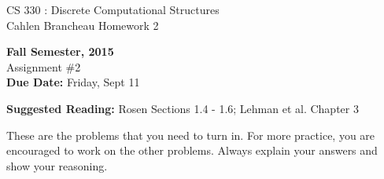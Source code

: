 \setlength{\oddsidemargin}{12pt}
\setlength{\textwidth}{6.5in}
\setlength{\textheight}{9in}
\pagestyle{empty}
\setlength{\parskip}{7pt plus 2pt minus 2pt}



\begin{center}
{{\large CS 330 : Discrete Computational Structures}}\\
Cahlen Brancheau Homework 2

\vspace*{1cm}

{\bf Fall Semester, 2015}\\

{\sc Assignment \#2}\\
{\bf Due Date:}  Friday, Sept 11
\end{center}

{\bf Suggested Reading:} Rosen Sections 1.4 - 1.6; Lehman et al. Chapter 3

These are the problems that you need to turn in. For more
practice, you are encouraged to work on the other problems. Always
explain your answers and show your reasoning.

